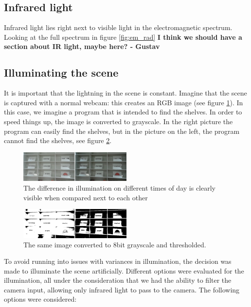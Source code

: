 \subsection{Infrared light}

Infrared light lies right next to visible light in the electromagnetic spectrum. Looking at the full spectrum in figure \ref{fig:em_rad} 
\textbf{I think we should have a section about IR light, maybe here? - Gustav}

\subsection{Illuminating the scene}

It is important that the lightning in the scene is constant. Imagine that the scene is captured with a normal webcam: this creates an RGB image (see figure \ref{fig:scene_light}). In this case, we imagine a program that is intended to find the shelves. In order to speed things up, the image is converted to grayscale. In the right picture the program can easily find the shelves, but in the picture on the left, the program cannot find the shelves, see figure \ref{fig:scene_thresholded}.

\begin{figure}[htbp] 
\centering 
\includegraphics[width=0.5\textwidth]{Pictures/HjoerringLibrary/scene_lighting.png} 
\caption{The difference in illumination on different times of day is clearly visible when compared next to each other} 
\label{fig:scene_light} 
\end{figure}

\begin{figure}[htbp] 
\centering 
\includegraphics[width=0.5\textwidth]{Pictures/HjoerringLibrary/scene_lighting_thresholded.png} 
\caption{The same image converted to 8bit grayscale and thresholded.} 
\label{fig:scene_thresholded} 
\end{figure}

To avoid running into issues with variances in illumination, the decision was made to illuminate the scene artificially. Different options were evaluated for the illumination, all under the consideration that we had the ability to filter the camera input, allowing only infrared light to pass to the camera. The following options were considered:

